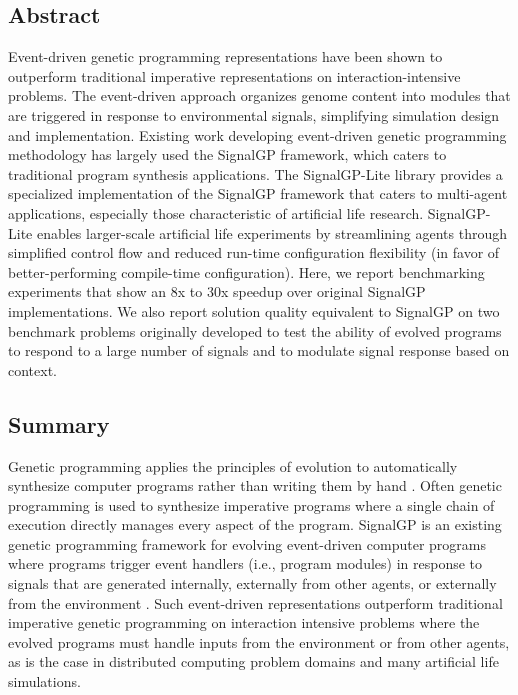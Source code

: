 



\subsection{Abstract}

Event-driven genetic programming representations have been shown to outperform traditional imperative representations on interaction-intensive problems.
The event-driven approach organizes genome content into modules that are triggered in response to environmental signals, simplifying simulation design and implementation.
Existing work developing event-driven genetic programming methodology has largely used the SignalGP framework, which caters to traditional program synthesis applications.
The SignalGP-Lite library provides a specialized implementation of the SignalGP framework that caters to multi-agent applications, especially those characteristic of artificial life research.
SignalGP-Lite enables larger-scale artificial life experiments by streamlining agents through simplified control flow and reduced run-time configuration flexibility (in favor of better-performing compile-time configuration).
Here, we report benchmarking experiments that show an 8x to 30x speedup over original SignalGP implementations.
We also report solution quality equivalent to SignalGP on two benchmark problems originally developed to test the ability of evolved programs to respond to a large number of signals and to modulate signal response based on context.

\subsection{Summary}

Genetic programming applies the principles of evolution to automatically synthesize computer programs rather than writing them by hand \citep{banzhaf1998genetic}.
Often genetic programming is used to synthesize imperative programs where a single chain of execution directly manages every aspect of the program.
SignalGP is an existing genetic programming framework for evolving event-driven computer programs where programs trigger event handlers (i.e., program modules) in response to signals that are generated internally, externally from other agents, or externally from the environment \citep{lalejini2018evolving}.
Such event-driven representations outperform traditional imperative genetic programming on interaction intensive problems where the evolved programs must handle inputs from the environment or from other agents, as is the case in distributed computing problem domains and many artificial life simulations.

